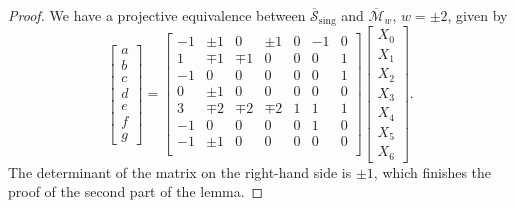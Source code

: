 \documentclass[a4paper,reqno]{amsart}
\numberwithin{equation}{section}
\numberwithin{equation}{section}
\begin{document}
\begin{proof}
    We have a projective equivalence between $\overline{\mathcal{S}}_{\operatorname{sing}}$ and $\overline{\mathcal{M}}_{w}$, $w=\pm 2$, given by
    \begin{equation} \label{eq:projectivityStoMsingPII}
        \begin{bmatrix}
    a\\
    b\\
    c\\
    d\\
    e\\
    f\\
    g
    \end{bmatrix}
    = 
\begin{bmatrix}
 -1 & \pm 1 & 0 & \pm 1 & 0 & -1 & 0 \\
 1 & \mp 1 & \mp 1 & 0 & 0 & 0 & 1 \\
 -1 & 0 & 0 & 0 & 0 & 0 & 1 \\
 0 & \pm 1 & 0 & 0 & 0 & 0 & 0 \\
 3 & \mp 2 & \mp 2 & \mp 2 & 1 & 1 & 1 \\
 -1 & 0 & 0 & 0 & 0 & 1 & 0 \\
 -1 & \pm 1 & 0 & 0 & 0 & 0 & 0 \\
\end{bmatrix}
    \begin{bmatrix}
    X_0\\
    X_1\\
    X_2\\
    X_3\\
    X_4\\
    X_5\\
    X_6
    \end{bmatrix}.
    \end{equation}
    The determinant of the matrix on the right-hand side is $\pm 1$, which finishes the proof of the second part of the lemma.
\end{proof}
\end{document}
